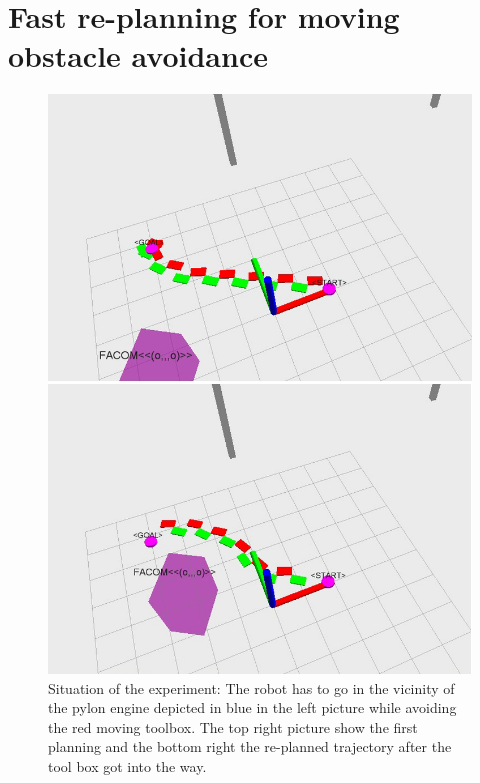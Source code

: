 \section{Fast re-planning for moving obstacle avoidance}

\begin{figure}[ht]
  \begin{center}
   \hspace*{2cm}
  \includegraphics[height=0.5\linewidth]{./figures/Replanning-Start-End.png}
  \caption{Situation of the experiment: The robot has to go in the vicinity of the pylon engine depicted in blue in the left picture while avoiding the red moving toolbox.
  The top right picture show the first planning and the bottom right the re-planned trajectory after the tool box got into the way.}
  \label{fig:fast:replanning:situation}
  \end{center}
\end{figure}

